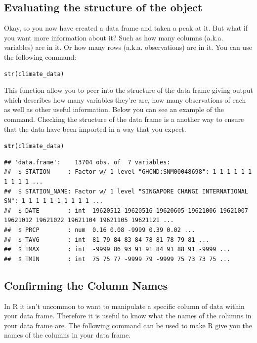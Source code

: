 \documentclass{article}\usepackage[]{graphicx}\usepackage[]{color}
\makeatletter
\newcommand{\hlstd}[1]{\textcolor[rgb]{0.345,0.345,0.345}{#1}}%
\newcommand{\hlkwd}[1]{\textcolor[rgb]{0.737,0.353,0.396}{\textbf{#1}}}%
\newenvironment{kframe}{%
 \def\at@end@of@kframe{}%
 \ifinner\ifhmode%
  \def\at@end@of@kframe{\end{minipage}}%
  \begin{minipage}{\columnwidth}%
 \fi\fi%
 \def\FrameCommand##1{\hskip\@totalleftmargin \hskip-\fboxsep
 \colorbox{shadecolor}{##1}\hskip-\fboxsep
     \hskip-\linewidth \hskip-\@totalleftmargin \hskip\columnwidth}%
 \MakeFramed {\advance\hsize-\width
   \@totalleftmargin\z@ \linewidth\hsize
   \@setminipage}}%
 {\par\unskip\endMakeFramed%
 \at@end@of@kframe}
\newenvironment{knitrout}{}{} %
\makeatother
\begin{document}
\subsection{Evaluating the structure of the object}

Okay, so you now have created a data frame and taken a peak at it. But what if you want more information about it? Such as how many columns (a.k.a. variables) are in it. Or how many rows (a.k.a. observations) are in it. You can use the following command: \\
\begin{verbatim}
str(climate_data)
\end{verbatim} 
This function allow you to peer into the structure of the data frame giving output which describes how many variables they're are, how many observations of each as well as other useful information. Below you can see an example of the command. Checking the structure of the data frame is a another way to ensure that the data have been imported in a way that you expect.
\begin{knitrout}
\color{fgcolor}\begin{kframe}
\begin{alltt}
\hlkwd{str}\hlstd{(climate_data)}
\end{alltt}
\begin{verbatim}
## 'data.frame':	13704 obs. of  7 variables:
##  $ STATION     : Factor w/ 1 level "GHCND:SNM00048698": 1 1 1 1 1 1 1 1 1 1 ...
##  $ STATION_NAME: Factor w/ 1 level "SINGAPORE CHANGI INTERNATIONAL SN": 1 1 1 1 1 1 1 1 1 1 ...
##  $ DATE        : int  19620512 19620516 19620605 19621006 19621007 19621012 19621022 19621104 19621105 19621121 ...
##  $ PRCP        : num  0.16 0.08 -9999 0.39 0.02 ...
##  $ TAVG        : int  81 79 84 83 84 78 81 78 79 81 ...
##  $ TMAX        : int  -9999 86 93 91 91 84 91 88 91 -9999 ...
##  $ TMIN        : int  75 75 77 -9999 79 -9999 75 73 73 75 ...
\end{verbatim}
\end{kframe}
\end{knitrout}
\subsection{Confirming the Column Names}
In R it isn't uncommon to want to manipulate a specific column of data within your data frame. Therefore it is useful to know what the names of the columns in your data frame are. The following command can be used to make R give you the names of the columns in your data frame. 
\end{document}
